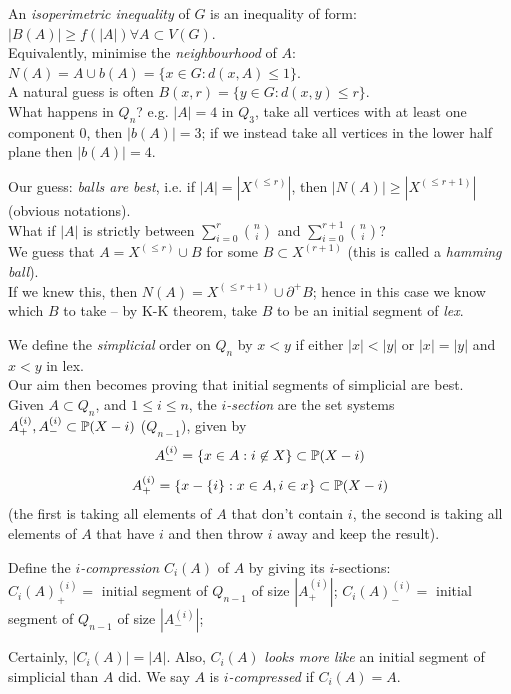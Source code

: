 \documentclass[a4paper]{article}
\begin{document}
An \emph{isoperimetric inequality} of $G$ is an inequality of form: $|B(A)| \geq f(|A|) \forall A \subset V(G)$.\\
Equivalently, minimise the \emph{neighbourhood} of $A$: $N(A) = A \cup b(A) = \{x \in G: d(x,A) \leq 1\}$.\\
A natural guess is often $B(x,r) = \{y \in G: d(x,y) \leq r\}$.\\
What happens in $Q_n$? e.g. $|A| = 4$ in $Q_3$, take all vertices with at least one component 0, then $|b(A)| = 3$; if we instead take all vertices in the lower half plane then $|b(A)| = 4$.

Our guess: \emph{balls are best}, i.e. if $|A| = |X^{(\leq r)}|$, then $|N(A)| \geq |X^{(\leq r+1)}|$ (obvious notations).\\
What if $|A|$ is strictly between $\sum_{i=0}^r {n \choose i}$ and $\sum_{i=0}^{r+1} {n \choose i}$?\\
We guess that $A=X^{(\leq r)} \cup B$ for some $B \subset X^{(r+1)}$ (this is called a \emph{hamming ball}).\\
If we knew this, then $N(A) = X^{(\leq r+1)} \cup \partial^+ B$; hence in this case we know which $B$ to take -- by K-K theorem, take $B$ to be an initial segment of \emph{lex}.

We define the \emph{simplicial} order on $Q_n$ by $x<y$ if either $|x| < |y|$ or $|x|=|y|$ and $x<y$ in lex.\\
Our aim then becomes proving that initial segments of simplicial are best.\\

Given $A \subset Q_n$, and $1 \leq i \leq n$, the \emph{$i$-section} are the set systems $A^{(i)}_+, A^{(i)}_- \subset \P(X-i)$ (\emph{$Q_{n-1}$}), given by
$$A^{(i)}_- = \{x \in A:i \not\in X \} \subset \P(X-i)$$
$$A^{(i)}_+ = \{x -\{i\}: x \in A, i \in x\} \subset \P(X-i)$$
(the first is taking all elements of $A$ that don't contain $i$, the second is taking all elements of $A$ that have $i$ and then throw $i$ away and keep the result).

Define the \emph{$i$-compression} $C_i(A)$ of $A$ by giving its $i$-sections:\\
$C_i(A)^{(i)}_+ =$ initial segment of $Q_{n-1}$ of size $|A^{(i)}_+|$;
$C_i(A)^{(i)}_- =$ initial segment of $Q_{n-1}$ of size $|A^{(i)}_-|$;

Certainly, $|C_i(A)| = |A|$. Also, $C_i(A)$ \emph{looks more like} an initial segment of simplicial than $A$ did. We say $A$ is \emph{$i$-compressed} if $C_i(A) = A$.
\end{document}
